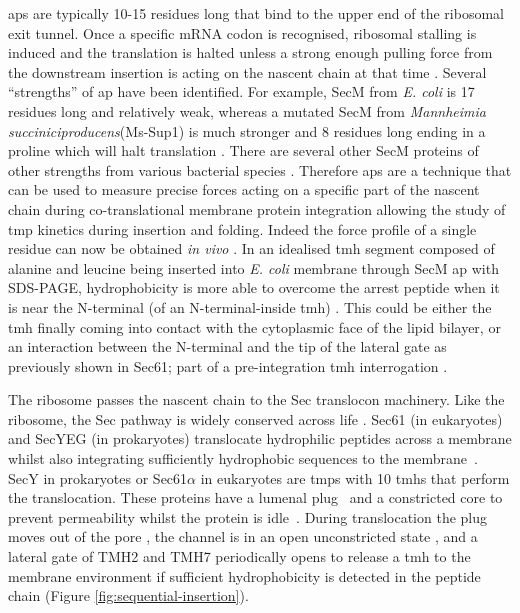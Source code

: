 \gls{ap}s are typically 10-15 residues long that bind to the upper end of the ribosomal exit tunnel.
Once a specific mRNA codon is recognised, ribosomal stalling is induced \cite{Ito2010} and the translation is halted unless a strong enough pulling force from the downstream insertion is acting on the nascent chain at that time \cite{Butkus2003}.
Several ``strengths'' of \gls{ap} have been identified.
For example, SecM from \textit{E. coli} is 17 residues long and relatively weak, whereas a mutated SecM from \textit{Mannheimia succiniciproducens}(Ms-Sup1) is much stronger and 8 residues long ending in a proline which will halt translation \cite{Ismail2012}.
There are several other SecM proteins of other strengths from various bacterial species \cite{Yap2009}.
Therefore \gls{ap}s are a technique that can be used to measure precise forces acting on a specific part of the nascent chain during co-translational membrane protein integration allowing the study of \gls{tmp} kinetics during insertion and folding.
Indeed the force profile of a single residue can now be obtained \textit{in vivo} \cite{Ismail2012}.
In an idealised \gls{tmh} segment composed of alanine and leucine being inserted into \textit{E. coli} membrane through SecM \gls{ap} with SDS-PAGE, hydrophobicity is more able to overcome the arrest peptide when it is near the N-terminal (of an N-terminal-inside \gls{tmh}) \cite{Ismail2012}.
This could be either the \gls{tmh} finally coming into contact with the cytoplasmic face of the lipid bilayer, or an interaction between the N-terminal and the tip of the lateral gate as previously shown in Sec61; part of a pre-integration \gls{tmh} interrogation \cite{MacKinnon2014}.

The ribosome passes the nascent chain to the Sec translocon machinery.
Like the ribosome, the Sec pathway is widely conserved across life \cite{Cao2003}.
Sec61 (in eukaryotes) and SecYEG (in prokaryotes) translocate hydrophilic peptides across a membrane whilst also integrating sufficiently hydrophobic sequences to the membrane~\cite{Junne2010, Park2012, Shao2011, Cymer2015}.
SecY in prokaryotes or Sec61$\alpha$ in eukaryotes are \gls{tmp}s with 10 \gls{tmh}s that perform the translocation.
These proteins have a lumenal plug~\cite{Tam2005, Junne2006} and a constricted core to prevent permeability whilst the protein is idle~\cite{Junne2010}.
During translocation the plug moves out of the pore \cite{Li2016}, the channel is in an open unconstricted state \cite{Junne2010}, and a lateral gate of TMH2 and TMH7 \cite{VandenBerg2004} periodically opens to release a \gls{tmh} to the membrane environment if sufficient hydrophobicity is detected in the peptide chain \cite{Junne2010, Egea2010}(Figure \ref{fig:sequential-insertion}).


